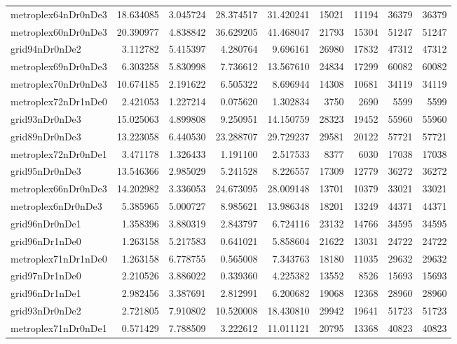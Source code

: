 \begin{longtable}{|l|r|r|r|r|r|r|r|r|}
metroplex64nDr0nDe3 & 18.634085 & 3.045724 & 28.374517 & 31.420241 & 15021 & 11194 & 36379 & 36379 \\
metroplex60nDr0nDe3 & 20.390977 & 4.838842 & 36.629205 & 41.468047 & 21793 & 15304 & 51247 & 51247 \\
grid94nDr0nDe2 & 3.112782 & 5.415397 & 4.280764 & 9.696161 & 26980 & 17832 & 47312 & 47312 \\
metroplex69nDr0nDe3 & 6.303258 & 5.830998 & 7.736612 & 13.567610 & 24834 & 17299 & 60082 & 60082 \\
metroplex70nDr0nDe3 & 10.674185 & 2.191622 & 6.505322 & 8.696944 & 14308 & 10681 & 34119 & 34119 \\
metroplex72nDr1nDe0 & 2.421053 & 1.227214 & 0.075620 & 1.302834 & 3750 & 2690 & 5599 & 5599 \\
grid93nDr0nDe3 & 15.025063 & 4.899808 & 9.250951 & 14.150759 & 28323 & 19452 & 55960 & 55960 \\
grid89nDr0nDe3 & 13.223058 & 6.440530 & 23.288707 & 29.729237 & 29581 & 20122 & 57721 & 57721 \\
metroplex72nDr0nDe1 & 3.471178 & 1.326433 & 1.191100 & 2.517533 & 8377 & 6030 & 17038 & 17038 \\
grid95nDr0nDe3 & 13.546366 & 2.985029 & 5.241528 & 8.226557 & 17309 & 12779 & 36272 & 36272 \\
metroplex66nDr0nDe3 & 14.202982 & 3.336053 & 24.673095 & 28.009148 & 13701 & 10379 & 33021 & 33021 \\
metroplex6nDr0nDe3 & 5.385965 & 5.000727 & 8.985621 & 13.986348 & 18201 & 13249 & 44371 & 44371 \\
grid96nDr0nDe1 & 1.358396 & 3.880319 & 2.843797 & 6.724116 & 23132 & 14766 & 34595 & 34595 \\
grid96nDr1nDe0 & 1.263158 & 5.217583 & 0.641021 & 5.858604 & 21622 & 13031 & 24722 & 24722 \\
metroplex71nDr1nDe0 & 1.263158 & 6.778755 & 0.565008 & 7.343763 & 18180 & 11035 & 29632 & 29632 \\
grid97nDr1nDe0 & 2.210526 & 3.886022 & 0.339360 & 4.225382 & 13552 & 8526 & 15693 & 15693 \\
grid96nDr1nDe1 & 2.982456 & 3.387691 & 2.812991 & 6.200682 & 19068 & 12368 & 28960 & 28960 \\
grid93nDr0nDe2 & 2.721805 & 7.910802 & 10.520008 & 18.430810 & 29942 & 19641 & 51723 & 51723 \\
metroplex71nDr0nDe1 & 0.571429 & 7.788509 & 3.222612 & 11.011121 & 20795 & 13368 & 40823 & 40823 \\

\end{longtable}
